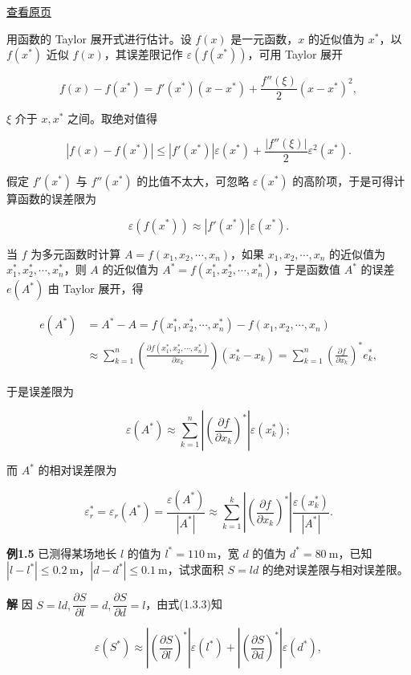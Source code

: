 \documentclass[
  10pt,
  fontset=fandol]{ctexart}
\begin{document}
\href{../../source-images/pdf-021.jpeg}{查看原页}

用函数的 Taylor 展开式进行估计。设 \(f(x)\) 是一元函数，\(x\) 的近似值为 \(x^*\)，以 \(f(x^*)\) 近似 \(f(x)\)，其误差限记作 \(\varepsilon(f(x^*))\)，可用 Taylor 展开

\[
f(x)-f(x^*)=f'(x^*)(x-x^*)+\frac{f''(\xi)}{2}(x-x^*)^2,
\]

\(\xi\) 介于 \(x,x^*\) 之间。取绝对值得

\[
|f(x)-f(x^*)|\leqslant |f'(x^*)|\varepsilon(x^*)+\frac{|f''(\xi)|}{2}\varepsilon^2(x^*).
\]

假定 \(f'(x^*)\) 与 \(f''(x^*)\) 的比值不太大，可忽略 \(\varepsilon(x^*)\) 的高阶项，于是可得计算函数的误差限为

\[
\varepsilon(f(x^*))\approx |f'(x^*)|\varepsilon(x^*).
\]

当 \(f\) 为多元函数时计算 \(A=f(x_1,x_2,\cdots,x_n)\)，如果 \(x_1,x_2,\cdots,x_n\) 的近似值为 \(x_1^*,x_2^*,\cdots,x_n^*\)，则 \(A\) 的近似值为 \(A^*=f(x_1^*,x_2^*,\cdots,x_n^*)\)，于是函数值 \(A^*\) 的误差 \(e(A^*)\) 由 Taylor 展开，得

\[
\begin{aligned}
e(A^*)&=A^*-A=f(x_1^*,x_2^*,\cdots,x_n^*)-f(x_1,x_2,\cdots,x_n)\\
&\approx\sum_{k=1}^{n}\left(\frac{\partial f(x_1^*,x_2^*,\cdots,x_n^*)}{\partial x_k}\right)(x_k^*-x_k)
=\sum_{k=1}^{n}\left(\frac{\partial f}{\partial x_k}\right)^*e_k^*,
\end{aligned}
\]

于是误差限为

\[
\varepsilon(A^*)\approx\sum_{k=1}^{n}\left|\left(\frac{\partial f}{\partial x_k}\right)^*\right|\varepsilon(x_k^*);
\tag{1.3.3}
\]

而 \(A^*\) 的相对误差限为

\[
\varepsilon_r^*=\varepsilon_r(A^*)=\frac{\varepsilon(A^*)}{|A^*|}\approx\sum_{k=1}^{k}\left|\left(\frac{\partial f}{\partial x_k}\right)^*\right|\frac{\varepsilon(x_k^*)}{|A^*|}.
\tag{1.3.4}
\]

\textbf{例1.5} 已测得某场地长 \(l\) 的值为 \(l^*=110\ \mathrm{m}\)，宽 \(d\) 的值为 \(d^*=80\ \mathrm{m}\)，已知 \(|l-l^*|\leqslant 0.2\ \mathrm{m}\)，\(|d-d^*|\leqslant 0.1\ \mathrm{m}\)，试求面积 \(S=ld\) 的绝对误差限与相对误差限。

\textbf{解} 因 \(S=ld,\dfrac{\partial S}{\partial l}=d,\dfrac{\partial S}{\partial d}=l\)，由式(1.3.3)知

\[
\varepsilon(S^*)\approx\left|\left(\frac{\partial S}{\partial l}\right)^*\right|\varepsilon(l^*)+\left|\left(\frac{\partial S}{\partial d}\right)^*\right|\varepsilon(d^*),
\]
\end{document}
